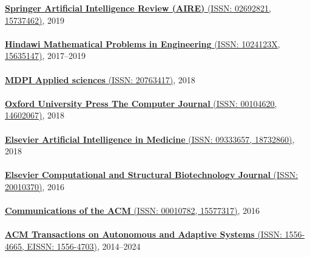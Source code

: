 \href{https://link.springer.com/journal/10462}{\textbf{Springer Artificial Intelligence Review (AIRE)} (ISSN: 02692821, 15737462)}, 2019
\\ \halfblankline \\
\href{https://www.hindawi.com/journals/mpe/}{\textbf{Hindawi Mathematical Problems in Engineering} (ISSN: 1024123X, 15635147)}, 2017--2019
\\ \halfblankline \\
\href{http://www.mdpi.com/journal/applsci}{\textbf{MDPI Applied sciences} (ISSN: 20763417)}, 2018
\\ \halfblankline \\
\href{https://academic.oup.com/comjnl}{\textbf{Oxford University Press The Computer Journal} (ISSN: 00104620, 14602067)}, 2018
\\ \halfblankline \\
\href{https://www.journals.elsevier.com/artificial-intelligence-in-medicine/}{\textbf{Elsevier Artificial Intelligence in Medicine} (ISSN: 09333657, 18732860)}, 2018
\\ \halfblankline \\
\href{https://www.journals.elsevier.com/computational-and-structural-biotechnology-journal/}{\textbf{Elsevier Computational and Structural Biotechnology Journal} (ISSN: 20010370)}, 2016
\\ \halfblankline \\
\href{http://cacm.acm.org/}{\textbf{Communications of the ACM} (ISSN: 00010782, 15577317)}, 2016
\\ \halfblankline \\
\href{https://dl.acm.org/journal/taas}{\textbf{ACM Transactions on Autonomous and Adaptive Systems} (ISSN: 1556-4665, EISSN: 1556-4703)}, 2014--2024
